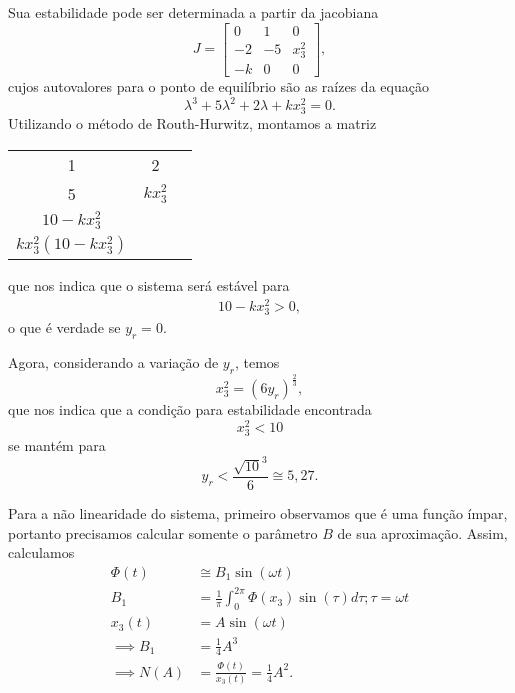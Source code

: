 \documentclass[a4paper]{report}
\begin{document}
Sua estabilidade pode ser determinada a partir da jacobiana \[
J = \begin{bmatrix} 
    0 & 1 & 0 \\
    -2 & -5 & x_3^2 \\
    -k & 0 & 0
\end{bmatrix} 
,\] cujos autovalores para o ponto de equilíbrio são as raízes da equação \[
\lambda^3 + 5\lambda^2 +2\lambda +kx_3^2 = 0
.\] Utilizando o método de Routh-Hurwitz, montamos a matriz
\begin{center}
\begin{tabular}{c c c}
    1 & 2 \\
    5 & $kx_3^2$ \\
    $10 -kx_3^2$ & \\
    $kx_3^2\left( 10-kx_3^2 \right) $
\end{tabular}
\end{center}
que nos indica que o sistema será estável para
\begin{align*}
    10 - kx_3^2 > 0
,\end{align*}
o que é verdade se $y_r = 0$.


Agora, considerando a variação de $y_r$, temos \[
x_3^2 = \left( 6y_r \right) ^{\frac{2}{3}}
,\] que nos indica que a condição para estabilidade encontrada \[
x_3^2<10
\] se mantém para \[
y_r < \frac{\sqrt{10}^3}{6} \cong 5,27
.\] 


Para a não linearidade do sistema, primeiro observamos que é uma função ímpar, portanto precisamos calcular somente o parâmetro $B$ de sua aproximação. Assim, calculamos
\begin{align*}
    \Phi(t) &\cong B_1\sin\left( \omega t \right) \\
    B_1 &= \frac{1}{\pi}\int_0^{2\pi}\Phi\left( x_3 \right) \sin\left( \tau\right) d\tau ; \tau = \omega t \\
    x_3(t) &= A\sin\left( \omega t \right)  \\
    \implies B_1 &= \frac{1}{4}A^3 \\
    \implies N(A) &= \frac{\Phi(t)}{x_3(t)} = \frac{1}{4}A^2
.\end{align*}

\end{document}
